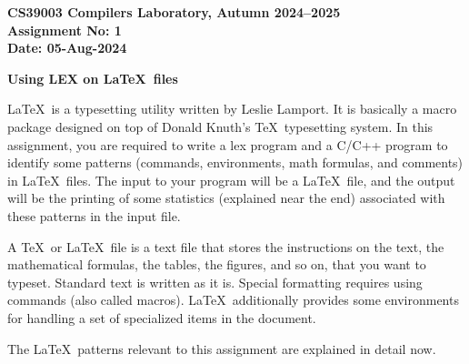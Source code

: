 \documentclass[12pt,fleqn,a4paper]{article}
\begin{document}
\begin{center}
\color{Navy}\bf
CS39003 Compilers Laboratory, Autumn 2024--2025\\
Assignment No: 1\\
Date: 05-Aug-2024

\hrulefill
\end{center}

\vspace*{-1.5\bigskipamount}
\begin{center}
\bf\color{red}Using LEX on \LaTeX\ files
\end{center}
\vspace*{-\bigskipamount}

\bigskip
\LaTeX\ is a typesetting utility written by Leslie Lamport. It is basically a macro
package designed on top of Donald Knuth's \TeX\ typesetting system. In this
assignment, you are required to write a lex program and a C/C++ program to identify some
patterns (commands, environments, math formulas, and comments) in \LaTeX\ files.
The input to your program will be a \LaTeX\ file, and the output will be the printing
of some statistics (explained near the end) associated with these patterns in the input
file.

A \TeX\ or \LaTeX\ file is a text file that stores the instructions on the text,
the mathematical formulas, the tables, the figures,
and so on, that you want to typeset. Standard text is written as it is. Special
formatting requires using commands (also called macros). \LaTeX\ additionally
provides some environments for handling a set of specialized items in the
document.

The \LaTeX\ patterns relevant to this assignment are explained in detail now.



\hrulefill
\end{document}
